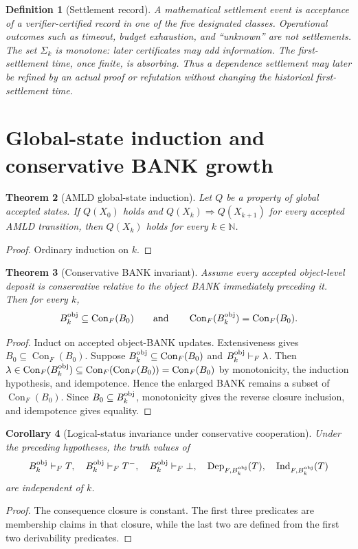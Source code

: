 \documentclass[11pt]{article}
\newtheorem{definition}{Definition}[section]
\newtheorem{theorem}[definition]{Theorem}
\newtheorem{corollary}[definition]{Corollary}
\theoremstyle{remark}
\newcommand{\Con}{\operatorname{Con}}
\newcommand{\Dep}{\operatorname{Dep}}
\newcommand{\Ind}{\operatorname{Ind}}
\begin{document}
\begin{definition}[Settlement record]
A mathematical settlement event is acceptance of a verifier-certified record in one of the five designated classes. Operational outcomes such as timeout, budget exhaustion, and ``unknown'' are not settlements. The set $\Sigma_k$ is monotone: later certificates may add information. The first-settlement time, once finite, is absorbing. Thus a dependence settlement may later be refined by an actual proof or refutation without changing the historical first-settlement time.
\end{definition}

\section{Global-state induction and conservative BANK growth}
\begin{theorem}[AMLD global-state induction]
Let $Q$ be a property of global accepted states. If $Q(X_0)$ holds and $Q(X_k)\Rightarrow Q(X_{k+1})$ for every accepted AMLD transition, then $Q(X_k)$ holds for every $k\in\mathbb N$.
\end{theorem}
\begin{proof}
Ordinary induction on $k$.
\end{proof}

\begin{theorem}[Conservative BANK invariant]
Assume every accepted object-level deposit is conservative relative to the object BANK immediately preceding it. Then for every $k$,
\[
B_k^{\rm obj}\subseteq\Con_F(B_0)
\qquad\text{and}\qquad
\Con_F(B_k^{\rm obj})=\Con_F(B_0).
\]
\end{theorem}
\begin{proof}
Induct on accepted object-BANK updates. Extensiveness gives $B_0\subseteq\Con_F(B_0)$. Suppose $B_k^{\rm obj}\subseteq\Con_F(B_0)$ and $B_k^{\rm obj}\vdash_F\lambda$. Then $\lambda\in\Con_F(B_k^{\rm obj})\subseteq\Con_F(\Con_F(B_0))=\Con_F(B_0)$ by monotonicity, the induction hypothesis, and idempotence. Hence the enlarged BANK remains a subset of $\Con_F(B_0)$. Since $B_0\subseteq B_k^{\rm obj}$, monotonicity gives the reverse closure inclusion, and idempotence gives equality.
\end{proof}

\begin{corollary}[Logical-status invariance under conservative cooperation]
Under the preceding hypotheses, the truth values of
\[
B_k^{\rm obj}\vdash_FT,\quad
B_k^{\rm obj}\vdash_FT^-,\quad
B_k^{\rm obj}\vdash_F\bot,\quad
\Dep_{F,B_k^{\rm obj}}(T),\quad
\Ind_{F,B_k^{\rm obj}}(T)
\]
are independent of $k$.
\end{corollary}
\begin{proof}
The consequence closure is constant. The first three predicates are membership claims in that closure, while the last two are defined from the first two derivability predicates.
\end{proof}
\end{document}
